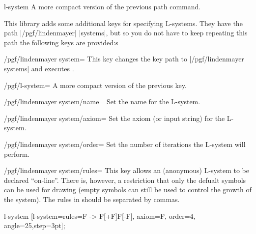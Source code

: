 \begin{pathoperation}{l-system}{ }
  A more compact version of the previous path command.
\end{pathoperation}

This library adds some additional keys for specifying L-systems. They
have the path |/pgf/lindenmayer| |systems|, but so you do not
have to keep repeating this path the following keys are provided:s
 
\begin{stylekey}{/pgf/lindenmayer system=}
This key changes the key path to |/pgf/lindenmayer systems| and
executes .
\end{stylekey}

\begin{stylekey}{/pgf/l-system=}
A more compact version of the previous key.
\end{stylekey}

\begin{key}{/pgf/lindenmayer system/name=}
  Set the name for the L-system. 
\end{key}

\begin{key}{/pgf/lindenmayer system/axiom=}
  Set the axiom (or input string) for the L-system. 
\end{key}

\begin{key}{/pgf/lindenmayer system/order=}
  Set the number of iterations the L-system will perform.
\end{key}

\begin{key}{/pgf/lindenmayer system/rules=}
  This key allows an (anonymous) L-system to be declared ``on-line''.
  There is, however, a restriction that only the defualt symbols can be
  used for drawing (empty symbols can still be used to control
  the growth of the system). The rules in  should
  be separated by commas.
  
\begin{codeexample}[]
\tikz[rotate=65] l-system
  [l-system={rules={F -> F[+F]F[-F]}, axiom=F, order=4, angle=25,step=3pt}];
\end{codeexample} 
\end{key}

